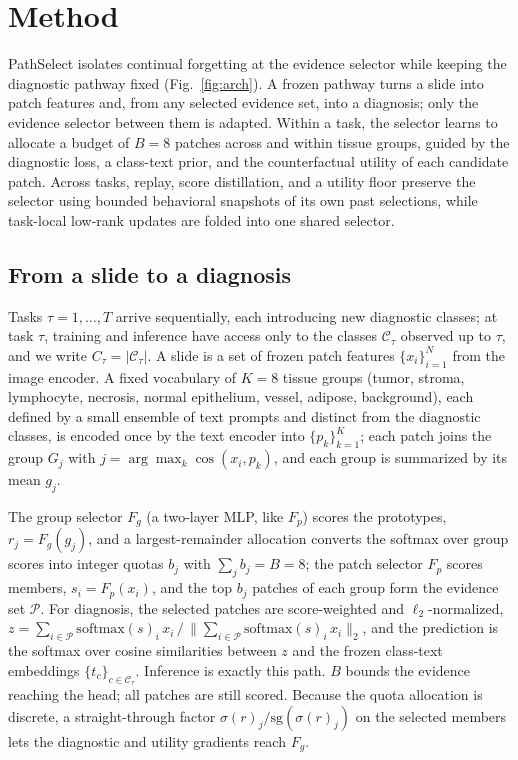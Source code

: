 \documentclass{article}
\newcommand{\Fg}{F_g}
\newcommand{\Fp}{F_p}
\newcommand{\Cls}{\mathcal{C}}
\newcommand{\Psel}{\mathcal{P}}
\begin{document}
\section{Method}
\label{sec:method}

PathSelect isolates continual forgetting at the evidence selector while keeping the diagnostic pathway fixed (Fig.~\ref{fig:arch}). A frozen pathway turns a slide into patch features and, from any selected evidence set, into a diagnosis; only the evidence selector between them is adapted. Within a task, the selector learns to allocate a budget of $B=8$ patches across and within tissue groups, guided by the diagnostic loss, a class-text prior, and the counterfactual utility of each candidate patch. Across tasks, replay, score distillation, and a utility floor preserve the selector using bounded behavioral snapshots of its own past selections, while task-local low-rank updates are folded into one shared selector.

\subsection{From a slide to a diagnosis}
\label{ssec:setup}

Tasks $\tau=1,\ldots,T$ arrive sequentially, each introducing new diagnostic classes; at task $\tau$, training and inference have access only to the classes $\Cls_\tau$ observed up to $\tau$, and we write $C_\tau=|\Cls_\tau|$. A slide is a set of frozen patch features $\{x_i\}_{i=1}^{N}$ from the image encoder. A fixed vocabulary of $K=8$ tissue groups (tumor, stroma, lymphocyte, necrosis, normal epithelium, vessel, adipose, background), each defined by a small ensemble of text prompts and distinct from the diagnostic classes, is encoded once by the text encoder into $\{p_k\}_{k=1}^{K}$; each patch joins the group $G_j$ with $j=\arg\max_k\cos(x_i,p_k)$, and each group is summarized by its mean $g_j$.

The group selector $\Fg$ (a two-layer MLP, like $\Fp$) scores the prototypes, $r_j=\Fg(g_j)$, and a largest-remainder allocation converts the softmax over group scores into integer quotas $b_j$ with $\sum_j b_j=B=8$; the patch selector $\Fp$ scores members, $s_i=\Fp(x_i)$, and the top $b_j$ patches of each group form the evidence set $\Psel$. For diagnosis, the selected patches are score-weighted and $\ell_2$-normalized, $z=\sum_{i\in\Psel}\mathrm{softmax}(s)_i\,x_i\,/\,\bigl\|\sum_{i\in\Psel}\mathrm{softmax}(s)_i\,x_i\bigr\|_2$, and the prediction is the softmax over cosine similarities between $z$ and the frozen class-text embeddings $\{t_c\}_{c\in\Cls_\tau}$. Inference is exactly this path. $B$ bounds the evidence reaching the head; all patches are still scored. Because the quota allocation is discrete, a straight-through factor $\sigma(r)_j/\mathrm{sg}(\sigma(r)_j)$ on the selected members lets the diagnostic and utility gradients reach $\Fg$.
\end{document}
